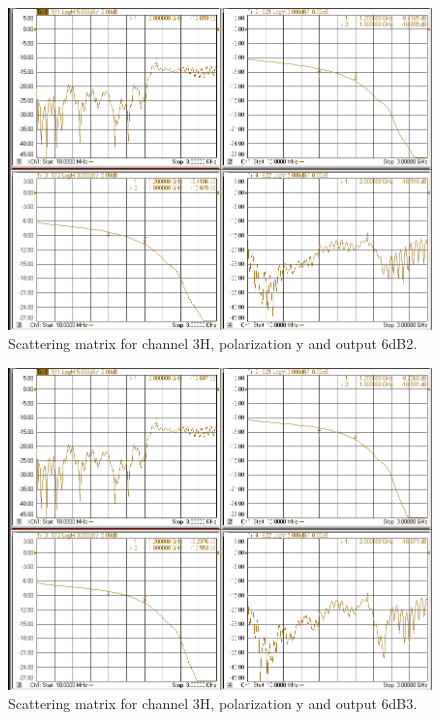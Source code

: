 \documentclass[12pt,a4paper,oneside]{article}
\begin{document}
\begin{figure}[H]
\centering
\includegraphics[width=0.9\linewidth]{VNA_results/3Hy_6dB2.png}
\caption{Scattering matrix for channel 3H, polarization y and output 6dB2.}
\label{fig:3Hy_6dB2}
\end{figure}


\begin{figure}[H]
\centering
\includegraphics[width=0.9\linewidth]{VNA_results/3Hy_6dB3.png}
\caption{Scattering matrix for channel 3H, polarization y and output 6dB3.}
\label{fig:3Hy_6dB3}
\end{figure}
\end{document}
